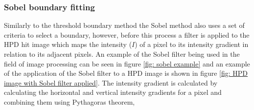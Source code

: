 




\subsubsection{Sobel boundary fitting}


Similarly to the threshold boundary method the Sobel method also uses a set of criteria to select a boundary, however, before this process a filter is applied to the HPD hit image which maps the intensity ($I$) of a pixel to its intensity gradient in relation to its adjacent pixels. An example of the Sobel filter being used in the field of image processing can be seen in figure \ref{fig: sobel example} and an example of the application of the Sobel filter to a HPD image is shown in figure \ref{fig: HPD image with Sobel filter applied}. The intensity gradient is calculated by calculating the horizontal and vertical intensity gradients for a pixel and combining them using Pythagoras theorem,

